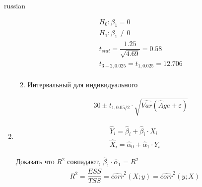\documentclass{article}
\begin{document}
\begin{otherlanguage*}{russian}
\begin{enumerate}
\begin{enumerate}
\begin{align*}
H_0: \beta_1 = 0 \\ 
H_1: \beta_1 \ne 0 \\
t_{stat} = \dfrac{1.25}{\sqrt{4.69}} = 0.58 \\
t_{3-2, 0.025} = t_{1, 0.025} = 12.706 \\
\end{align*}

\item Интервальный для индивидуального 

\begin{align*}
30 \pm t_{1, 0.05 / 2} \cdot \sqrt{\widehat{Var} (\hat Age + \varepsilon)}
\end{align*}
\end{enumerate}

\item 

\begin{align*}
\hat Y_i = \hat \beta_i + \hat \beta_i \cdot X_i \\
\hat X_i = \hat \alpha_0 + \hat \alpha_1 \cdot Y_i 
\end{align*}

Доказать что $R^2 $ совпадают, $ \hat \beta_1 \cdot \hat \alpha_1 = R^2 $
\begin{align*}
R^2 = \dfrac{ESS}{TSS} = \widehat{corr}^2 (X; y) = \widehat{corr}^2 (y;X) 
\end{align*}
\end{enumerate}
\end{otherlanguage*} 
\end{document}
